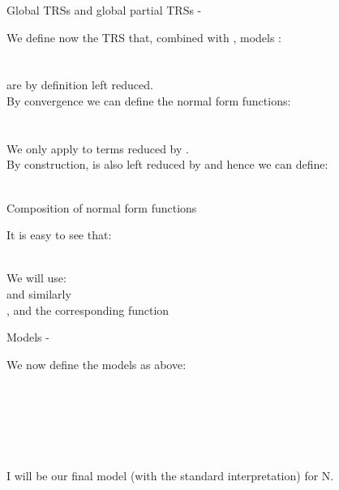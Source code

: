 \begin{definition}{Global TRSs and global partial TRSs - \m{\textcolor{blue}{R^t,R,r^t,r,R_C,r_C}}}
\label{def_4.3.1.3}

\noindent
We define now the TRS that, combined with , models :\\
\\
\\
 are by definition left reduced.\\
By convergence we can define the normal form functions:\\
\\
\\
We only apply  to terms reduced by . \\
By construction,  is also left reduced by  and hence we can define:\\
\\
\end{definition}

\begin{lemma}{Composition of normal form functions}

\noindent
It is easy to see that:\\
\\
\end{lemma}

\begin{definition}{}
\label{def_4.3.1.4}

\noindent
We will use:\\
 and similarly\\
, and the corresponding function \\
\end{definition}

\begin{definition}{Models - }
\label{def_4.3.1.5}

\noindent
We now define the models as above:\\
\\
\\
\\
\\
\\
\\
I will be our final model (with the standard interpretation) for N.
\end{definition}


